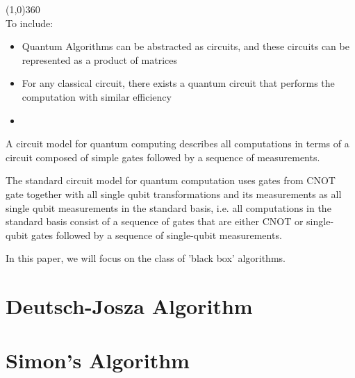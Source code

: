 \documentclass[12pt,twoside,fleqn]{report}
\theoremstyle{thmstyle}
\begin{document}
\line(1,0){360} \\

To include:
\begin{itemize}
\item Quantum Algorithms can be abstracted as circuits, and these circuits can be represented as a product of matrices
\item For any classical circuit, there exists a quantum circuit that performs the computation with similar efficiency
\item 
\end{itemize}

A circuit model for quantum computing describes all computations in terms of a circuit composed of simple gates followed by a sequence of measurements.

The standard circuit model for quantum computation uses gates from { CNOT gate together with all single qubit transformations} and its measurements as all single qubit measurements in the standard basis, i.e. all computations in the standard basis consist of a sequence of gates that are either CNOT or single-qubit gates followed by a sequence of single-qubit measurements.

In this paper, we will focus on the class of 'black box' algorithms.

\section{Deutsch-Josza Algorithm}

\section{Simon's Algorithm}
\end{document}
